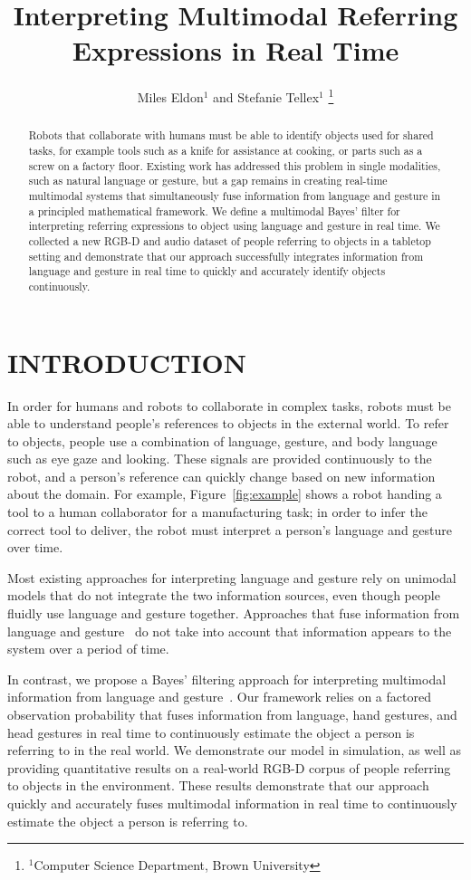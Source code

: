 \documentclass[letterpaper, 10 pt, conference]{ieeeconf}
\title{\LARGE \bf
Interpreting Multimodal Referring Expressions in Real Time}
\author{Miles Eldon$^{1}$ and Stefanie Tellex$^{1}$
\thanks{$^{1}$Computer Science Department, Brown University}
}
\begin{document}
\maketitle
\thispagestyle{empty}
\pagestyle{empty}

\begin{abstract}
Robots that collaborate with humans must be able to identify objects
used for shared tasks, for example tools such as a knife for
assistance at cooking, or parts such as a screw on a factory floor.
Existing work has addressed this problem in single modalities, such as
natural language or gesture, but a gap remains in creating real-time
multimodal systems that simultaneously fuse information from language
and gesture in a principled mathematical framework.  We define a
multimodal Bayes' filter for interpreting referring expressions to
object using language and gesture in real time.  We collected a new
RGB-D and audio dataset of people referring to objects in a tabletop
setting and demonstrate that our approach successfully integrates
information from language and gesture in real time to quickly and
accurately identify objects continuously.
\end{abstract}

\section{INTRODUCTION}

In order for humans and robots to collaborate in complex tasks, robots
must be able to understand people's references to objects in the
external world.  To refer to objects, people use a combination of
language, gesture, and body language such as eye gaze and looking.
These signals are provided continuously to the robot, and a person's
reference can quickly change based on new information about the
domain.  For example, Figure~\ref{fig:example} shows a robot handing a
tool to a human collaborator for a manufacturing task; in order to
infer the correct tool to deliver, the robot must interpret a person's
language and gesture over time.

Most existing approaches for interpreting language and gesture rely on
unimodal models that do not integrate the two information sources,
even though people fluidly use language and gesture together.
Approaches that fuse information from language and
gesture~\citep{matuszek14} do not take into account that information
appears to the system over a period of time.

In contrast, we propose a Bayes' filtering approach for interpreting
multimodal information from language and gesture~\citep{thrun08}.  Our
framework relies on a factored observation probability that fuses
information from language, hand gestures, and head gestures in real
time to continuously estimate the object a person is referring to in
the real world.  We demonstrate our model in simulation, as well as
providing quantitative results on a real-world RGB-D corpus of people
referring to objects in the environment.  These results demonstrate
that our approach quickly and accurately fuses multimodal information
in real time to continuously estimate the object a person is referring
to.
\end{document}
